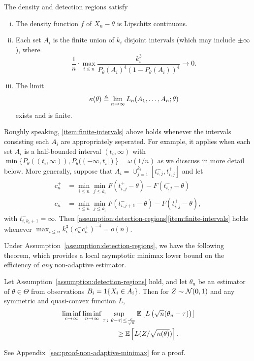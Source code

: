 \begin{assumption}
  \label{assumption:detection-regions}
  The density and detection regions satisfy
  \begin{enumerate}[(i)]
  \item \label{item:lipschitz-density}
    The density function $f$ of $X_n - \theta$ is Lipschitz continuous.
  \item \label{item:finite-intervals}
    Each set $A_i$ is the finite union of $k_i$ disjoint intervals
    (which may include $\pm \infty$), where
    \begin{equation*}
      \frac{1}{n} \cdot \max_{i \le n} \frac{k_i^3}{P_\theta(A_i)^4
        (1 - P_\theta(A_i))^4} \to 0.
    \end{equation*}
  \item \label{item:limit-variance}
    The limit
    \begin{equation}
      \label{eqn:LAN-limit}
      \kappa(\theta) \triangleq \lim_{n\to \infty} L_n(A_1,\ldots,A_n; \theta)
    \end{equation}
    exists and is finite.
  \end{enumerate}
\end{assumption}
Roughly speaking, \eqref{item:finite-intervals} above holds whenever the intervals consisting each $A_i$ are appropriately seperated. For example, it applies when each set $A_i$ is a half-bounded interval $(t_i,\infty)$ with $\min\{P_\theta((t_i,\infty)), P_\theta((-\infty,t_i])\} = \omega(1/n)$ as we dicscuss in more detail below. More generally, suppose that $A_i = \cup_{j=1}^{k_i}[t_{i,j}^-, t_{i,j}^+]$ and let 
\begin{align*}
c_n^+ & =  \min_{i \le n} \min_{j \leq k_i}  F(t^+_{i,j} - \theta) - F(t^-_{i,j}- \theta) \\
c_n^- & = \min_{i \le n} \min_{j \leq k_i}  F(t^-_{i,j+1}- \theta)  - F(t^+_{i,j}- \theta),
\end{align*}
with $t^-_{i,k_i+1} = \infty$. Then \ref{assumption:detection-regions}\eqref{item:finite-intervals} holds whenever $\max_{i \le n} k_i^3 (c_n^- c_n^+)^{-4} = o(n)$. 

Under Assumption~\ref{assumption:detection-regions}, we have the following theorem, which provides
a local asymptotic minimax lower bound on the efficiency of
\emph{any} non-adaptive estimator.
\begin{theorem}
  \label{theorem:non-adaptive-minimax}
  Let Assumption~\ref{assumption:detection-regions} hold, and
  let ${\theta}_n$ be an estimator of $\theta \in \Theta$ from
  observations $B_i = 1\!\left\{X_i \in A_i\right\}$.
  Then for $Z \sim \mathcal{N}(0, 1)$ and any
  symmetric and quasi-convex function $L$,
  \begin{align*}
    & \liminf_{c \to \infty} \liminf_{n \to \infty}
    \sup_{\tau\,:\,|\theta-\tau| \leq \frac{c}{\sqrt{n} }}
    \mathbb{E} \left[ L\left( \sqrt{n}({\theta}_{n} - \tau) \right) \right] \\
    & \qquad \qquad \qquad \qquad \geq
    \mathbb{E}\left[ L (Z/\sqrt{\kappa(\theta)}) \right].
  \end{align*}
\end{theorem}
\noindent
See Appendix~\ref{sec:proof-non-adaptive-minimax} for a proof.

